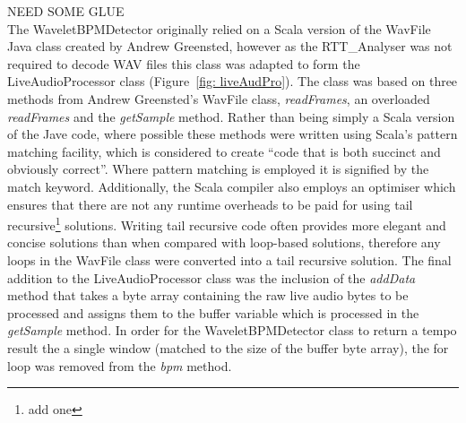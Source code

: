 \documentclass[a4paper, 11pt]{article}
\begin{document}
NEED SOME GLUE\\

The WaveletBPMDetector originally relied on a Scala version of the WavFile Java class created by Andrew Greensted\cite{green}, however as the RTT\_Analyser was not required to decode WAV files this class was adapted to form the LiveAudioProcessor class (Figure~\ref{fig: liveAudPro}). The class was based on three methods from Andrew Greensted's WavFile class\cite{green}, \textit{readFrames}, an overloaded \textit{readFrames} and the \textit{getSample} method. Rather than being simply a Scala version of the Jave code, where possible these methods were written using Scala's pattern matching facility, which is considered to create ``code that is both succinct and obviously correct''\cite{mariusEr}. Where pattern matching is employed it is signified by the match keyword. Additionally, the Scala compiler also employs an optimiser which ensures that there are not any runtime overheads to be paid for using tail recursive\footnote{add one} solutions. Writing tail recursive code often provides more elegant and concise solutions than when compared with loop-based solutions\cite{odesky}, therefore any loops in the WavFile class were converted into a tail recursive solution. The final addition to the LiveAudioProcessor class was the inclusion of the \textit{addData} method that takes a byte array containing the raw live audio bytes to be processed and assigns them to the buffer variable which is processed in the \textit{getSample} method. In order for the WaveletBPMDetector class to return a tempo result the a single window (matched to the size of the buffer byte array), the for loop was removed from the \textit{bpm} method.
\end{document}
